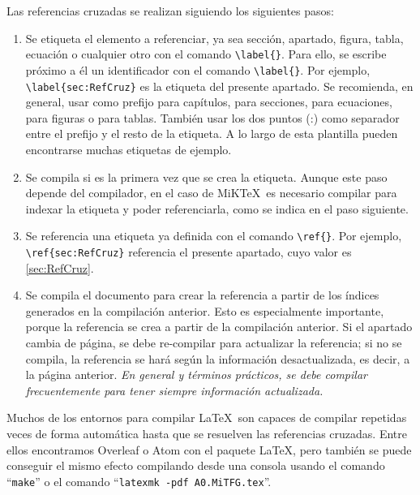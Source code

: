 Las referencias cruzadas se realizan siguiendo los siguientes pasos:

\begin{enumerate}

	\item Se etiqueta el elemento a referenciar, ya sea sección, apartado, figura, tabla, ecuación o cualquier otro con el comando \verb|\label{}|. Para ello, se escribe próximo a él un identificador con el comando \verb|\label{}|. Por ejemplo, \verb|\label{sec:RefCruz}| es la etiqueta del presente apartado. Se recomienda, en general, usar como prefijo  para capítulos,  para secciones,  para ecuaciones,  para figuras o  para tablas. También usar los dos puntos (:) como separador entre el prefijo y el resto de la etiqueta. A lo largo de esta plantilla pueden encontrarse muchas etiquetas de ejemplo.

	\item Se compila si es la primera vez que se crea la etiqueta. Aunque este paso depende del compilador, en el caso de MiK\TeX\ es necesario compilar para indexar la etiqueta y poder referenciarla, como se indica en el paso siguiente.

	\item Se referencia una etiqueta ya definida con el comando \verb|\ref{}|. Por ejemplo, \verb|\ref{sec:RefCruz}| referencia el presente apartado, cuyo valor es \ref{sec:RefCruz}.

	\item Se compila el documento para crear la referencia a partir de los índices generados en la compilación anterior. Esto es especialmente importante, porque la referencia se crea a partir de la compilación anterior. Si el apartado cambia de página, se debe re-compilar para actualizar la referencia; si no se compila, la referencia se hará según la información desactualizada, es decir, a la página anterior. \emph{En general y términos prácticos, se debe compilar frecuentemente para tener siempre información actualizada.}

\end{enumerate}

Muchos de los entornos para compilar \LaTeX\ son capaces de compilar repetidas veces de forma automática hasta que se resuelven las referencias cruzadas. Entre ellos encontramos Overleaf o Atom con el paquete LaTeX, pero también se puede conseguir el mismo efecto compilando desde una consola usando el comando ``\texttt{make}'' o el comando ``\texttt{latexmk -pdf A0.MiTFG.tex}''.

